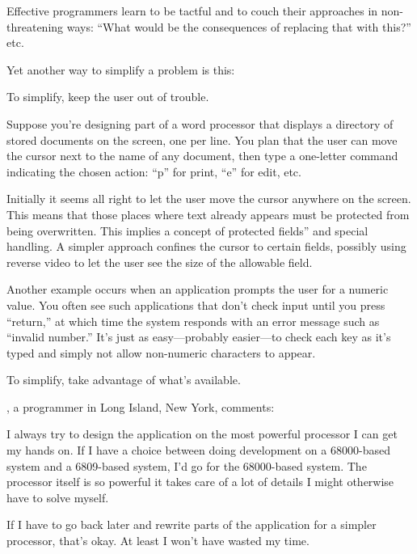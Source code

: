 \noindent Effective programmers learn to be tactful and to couch their
approaches in non-threatening ways: ``What would be the consequences
of replacing that with this?'' etc.

Yet another way to simplify a problem is this:

\begin{tip}
To simplify, keep the user out of trouble.
\end{tip}
\noindent Suppose you're designing part of a word processor that
displays a directory of stored documents on the screen, one per line.
You plan that the
user can move the cursor next to the name of any document, then type a
one-letter command indicating the chosen action: ``p'' for print,
``e'' for edit, etc.

Initially it seems all right to let the user move the cursor anywhere
on the screen. This means that those places where text already appears
must be protected from being overwritten. This implies a concept of
protected fields'' and special handling. A simpler approach confines
the cursor to certain fields, possibly using reverse video to let the
user see the size of the allowable field.

Another example occurs when an application prompts the user for a
numeric value. You often see such applications that don't check input
until you press ``return,'' at which time the system responds with an
error message such as ``invalid number.'' It's just as easy---probably
easier---to check each key as it's typed and simply not allow
non-numeric characters to appear.

\begin{tip}
To simplify, take advantage of what's available.
\end{tip}%
\begin{interview}
, a \Forth{} programmer in Long Island, New York,
comments:

\begin{tfquot}
I always try to design the application on the most powerful processor
I can get my hands on. If I have a choice between doing development on
a 68000-based system and a 6809-based system, I'd go for the
68000-based system. The processor itself is so powerful it takes care
of a lot of details I might otherwise have to solve myself.

If I have to go back later and rewrite parts of the application for a
simpler processor, that's okay. At least I won't have wasted my time.
\end{tfquot}
\end{interview}%

